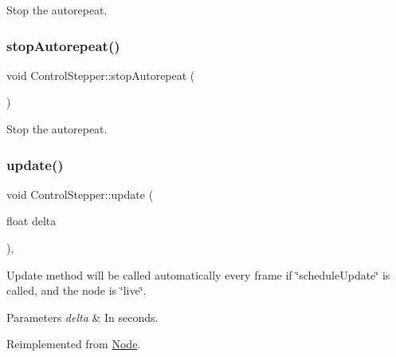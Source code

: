 Stop the autorepeat. \mbox{\label{classControlStepper_ab7bdf3d5a93aa96f7ba67f2896b2baec}} 
\subsubsection{\texorpdfstring{stop\+Autorepeat()}{stopAutorepeat()}\hspace{0.1cm}{\footnotesize\ttfamily [2/2]}}
{\footnotesize\ttfamily void Control\+Stepper\+::stop\+Autorepeat (\begin{DoxyParamCaption}{ }\end{DoxyParamCaption})}

Stop the autorepeat. \mbox{\label{classControlStepper_a29a2d69a159c790691365db8a9f87d33}} 
\subsubsection{\texorpdfstring{update()}{update()}\hspace{0.1cm}{\footnotesize\ttfamily [1/2]}}
{\footnotesize\ttfamily void Control\+Stepper\+::update (\begin{DoxyParamCaption}\item[{float}]{delta }\end{DoxyParamCaption})\hspace{0.3cm}{\ttfamily [override]}, {\ttfamily [virtual]}}

Update method will be called automatically every frame if \char`\"{}schedule\+Update\char`\"{} is called, and the node is \char`\"{}live\char`\"{}. 
\begin{DoxyParams}{Parameters}
{\em delta} & In seconds. \\
\hline
\end{DoxyParams}


Reimplemented from \hyperlink{classNode_a32878481ba54b3856ab53c10af13848e}{Node}.

\mbox{\label{classControlStepper_a29a2d69a159c790691365db8a9f87d33}} 
